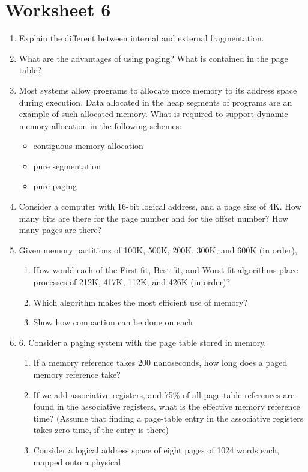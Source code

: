 \documentclass{article}
\begin{document}
	\section{Worksheet 6}
	\begin{enumerate}
		\item Explain the different between internal and external fragmentation.
		\item What are the advantages of using paging? What is contained in the page table?
		\item Most systems allow programs to allocate more memory to its address space during execution. Data allocated in the heap segments of programs are an example of such allocated memory. What is required to support dynamic memory allocation in the following schemes:
		\begin{itemize}
			\item contiguous-memory allocation
			\item pure segmentation
			\item pure paging
		\end{itemize}
		\item Consider a computer with 16-bit logical address, and a page size of 4K. How many bits are there for the page number and for the offset number? How many pages are there?
		\item Given memory partitions of 100K, 500K, 200K, 300K, and 600K (in order),
		\begin{enumerate}
			\item How would each of the First-fit, Best-fit, and Worst-fit algorithms place processes of 212K, 417K, 112K, and 426K (in order)?
			\item Which algorithm makes the most efficient use of memory?
			\item Show how compaction can be done on each
		\end{enumerate}
		\item 6. Consider a paging system with the page table stored in memory.
		\begin{enumerate}
			\item If a memory reference takes 200 nanoseconds, how long does a paged memory reference take?
			\item If we add associative registers, and 75\% of all page-table references are found in the associative registers, what is the effective memory reference time? (Assume that finding a page-table entry in the associative registers takes zero time, if the entry is there)
			\item Consider a logical address space of eight pages of 1024 words each, mapped onto a physical

\end{enumerate}
\end{enumerate}
\end{document}
